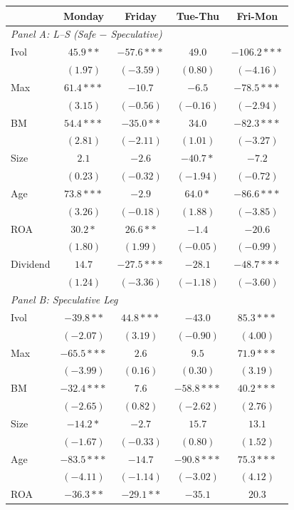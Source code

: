 \centering
\footnotesize
\begin{tabular}{l c c c c}
\toprule
 & Monday & Friday & Tue-Thu & Fri-Mon \\
\midrule
\multicolumn{5}{l}{\textit{Panel A: L--S (Safe $-$ Speculative)}} \\
Ivol & $45.9**$ & $-57.6***$ & $49.0$ & $-106.2***$ \\
 & $(1.97)$ & $(-3.59)$ & $(0.80)$ & $(-4.16)$ \\
Max & $61.4***$ & $-10.7$ & $-6.5$ & $-78.5***$ \\
 & $(3.15)$ & $(-0.56)$ & $(-0.16)$ & $(-2.94)$ \\
BM & $54.4***$ & $-35.0**$ & $34.0$ & $-82.3***$ \\
 & $(2.81)$ & $(-2.11)$ & $(1.01)$ & $(-3.27)$ \\
Size & $2.1$ & $-2.6$ & $-40.7*$ & $-7.2$ \\
 & $(0.23)$ & $(-0.32)$ & $(-1.94)$ & $(-0.72)$ \\
Age & $73.8***$ & $-2.9$ & $64.0*$ & $-86.6***$ \\
 & $(3.26)$ & $(-0.18)$ & $(1.88)$ & $(-3.85)$ \\
ROA & $30.2*$ & $26.6**$ & $-1.4$ & $-20.6$ \\
 & $(1.80)$ & $(1.99)$ & $(-0.05)$ & $(-0.99)$ \\
Dividend & $14.7$ & $-27.5***$ & $-28.1$ & $-48.7***$ \\
 & $(1.24)$ & $(-3.36)$ & $(-1.18)$ & $(-3.60)$ \\
\midrule
\multicolumn{5}{l}{\textit{Panel B: Speculative Leg}} \\
Ivol & $-39.8**$ & $44.8***$ & $-43.0$ & $85.3***$ \\
 & $(-2.07)$ & $(3.19)$ & $(-0.90)$ & $(4.00)$ \\
Max & $-65.5***$ & $2.6$ & $9.5$ & $71.9***$ \\
 & $(-3.99)$ & $(0.16)$ & $(0.30)$ & $(3.19)$ \\
BM & $-32.4***$ & $7.6$ & $-58.8***$ & $40.2***$ \\
 & $(-2.65)$ & $(0.82)$ & $(-2.62)$ & $(2.76)$ \\
Size & $-14.2*$ & $-2.7$ & $15.7$ & $13.1$ \\
 & $(-1.67)$ & $(-0.33)$ & $(0.80)$ & $(1.52)$ \\
Age & $-83.5***$ & $-14.7$ & $-90.8***$ & $75.3***$ \\
 & $(-4.11)$ & $(-1.14)$ & $(-3.02)$ & $(4.12)$ \\
ROA & $-36.3**$ & $-29.1**$ & $-35.1$ & $20.3$ \\

\end{tabular}

